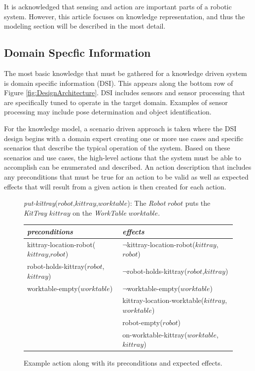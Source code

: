 It is acknowledged that sensing and action are important parts of a robotic system.
However, this article focuses on knowledge representation, and thus the modeling section
will be described in the most detail. 

\subsection{Domain Specfic Information}
The most basic knowledge that must be gathered for a knowledge
driven system is domain specific information (DSI). This appears along the bottom row of
Figure \ref{fig:DesignArchitecture}. DSI includes sensors and sensor processing that
are specifically tuned to operate in the target domain. Examples of sensor processing
may include pose determination and object identification.

For the knowledge model, a scenario driven approach is taken where
the DSI design begins with a domain expert creating one or more use cases and specific
scenarios that describe the typical operation of the system. Based on these scenarios and 
use cases, the high-level
actions that the system must be able to accomplish can be enumerated and described. 
An action description that includes any preconditions that
must be true for an action to be valid as well as expected effects that will result from a
given action is then created for each action. 

\begin{figure}[ht!]
\begin{center}
\textsl{put-kittray}($\mathit{robot}$,$\mathit{kittray}$,$\mathit{worktable}$): The \textit{Robot} 
$\mathit{robot}$ puts the \textit{KitTray} $\mathit{kittray}$ on the \textit{WorkTable} $\mathit{worktable}$.

\begin{tabular}{ l|l }
  \textit{preconditions} & \textit{effects} \\
  \hline
  \small {\textsf{kittray-location-robot}}(\small $\mathit{kittray}$,\small $\mathit{robot}$)
  &$\neg$\small {\textsf{kittray-location-robot}}(\small $\mathit{kittray}$,\small $\mathit{robot}$)\\
  \small {\textsf{robot-holds-kittray}}(\small $\mathit{robot}$,\small $\mathit{kittray}$)
  &$\neg$\small {\textsf{robot-holds-kittray}}(\small $\mathit{robot}$,\small $\mathit{kittray}$)\\
  \small {\textsf{worktable-empty}}(\small $\mathit{worktable}$)
  &$\neg$\small {\textsf{worktable-empty}}(\small $\mathit{worktable}$)\\
  &\small {\textsf{kittray-location-worktable}}(\small $\mathit{kittray}$,\small $\mathit{worktable}$)\\
  &\small {\textsf{robot-empty}}(\small $\mathit{robot}$)\\
  &\small {\textsf{on-worktable-kittray}}(\small $\mathit{worktable}$,\small $\mathit{kittray}$)\\
\end{tabular}
\caption{Example action along with its preconditions and expected effects.}
\label{fig:ActionExample}
\end{center}
\end{figure}

